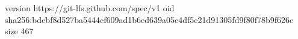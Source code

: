 version https://git-lfs.github.com/spec/v1
oid sha256:bdebf8d527ba5444cf609ad1b6ed639a05c4df5c21d91305fd9f80f78b9f626c
size 467
